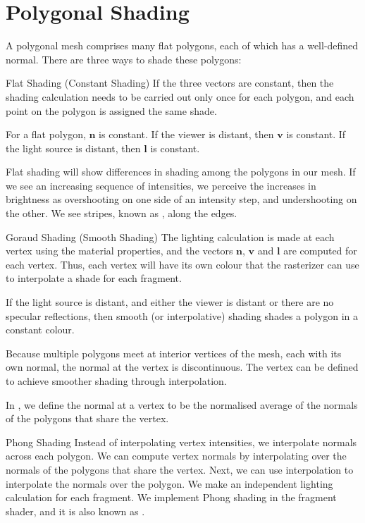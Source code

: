 \documentclass[../COS3712_Notes.tex]{subfiles}
\begin{document}
    \section{Polygonal Shading}
      A polygonal mesh comprises many flat polygons, each of which has a well-defined normal.
      There are three ways to shade these polygons:
      \begin{descriptimize}
        \item[Flat Shading (Constant Shading)] If the three vectors are constant,
          then the shading calculation needs to be carried out only once for each polygon,
          and each point on the polygon is assigned the same shade.

          For a flat polygon, $\mathbf{n}$ is constant.
          If the viewer is distant, then $\mathbf{v}$ is constant.
          If the light source is distant, then $\mathbf{l}$ is constant.

          Flat shading will show differences in shading among the polygons in our mesh.
          If we see an increasing sequence of intensities, we perceive the increases in brightness
          as overshooting on one side of an intensity step, and undershooting on the other.
          We see stripes, known as , along the edges.
        \item[Goraud Shading (Smooth Shading)] The lighting calculation is made at each vertex
          using the material properties, and the vectors $\mathbf{n}$, $\mathbf{v}$
          and $\mathbf{l}$ are computed for each vertex.
          Thus, each vertex will have its own colour that the rasterizer can use to interpolate
          a shade for each fragment.

          If the light source is distant, and either the viewer is distant or there are no
          specular reflections, then smooth (or interpolative) shading shades a polygon
          in a constant colour.

          Because multiple polygons meet at interior vertices of the mesh,
          each with its own normal, the normal at the vertex is discontinuous.
          The vertex can be defined to achieve smoother shading through interpolation.

          In , we define the normal at a vertex to be the normalised
          average of the normals of the polygons that share the vertex.
        \item[Phong Shading] Instead of interpolating vertex intensities, we interpolate
          normals across each polygon.
          We can compute vertex normals by interpolating over the normals of the polygons
          that share the vertex.
          Next, we can use interpolation to interpolate the normals over the polygon.
          We make an independent lighting calculation for each fragment.
          We implement Phong shading in the fragment shader, and it is also known as
          .
      \end{descriptimize}
\end{document}
